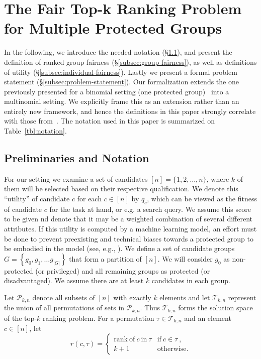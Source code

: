 
\section{The Fair Top-k Ranking Problem for Multiple Protected Groups}\label{sec:problem}

In the following, we introduce the needed notation (\S\ref{subsec:preliminaries}), and present the definition of ranked group fairness (\S\ref{subsec:group-fairness}), as well as definitions of utility (\S\ref{subsec:individual-fairness}). Lastly we present a formal problem statement (\S\ref{subsec:problem-statement}).
%
Our formalization extends the one previously presented for a binomial setting (one protected group)~\cite{zehlike2017fair} into a multinomial setting. 
%
We explicitly frame this as an extension rather than an entirely new framework, and hence the definitions in this paper strongly correlate with those from~\cite{zehlike2017fair}.
%
The notation used in this paper is summarized on Table~\ref{tbl:notation}.

\subsection{Preliminaries and Notation}
\label{subsec:preliminaries}
For our setting we examine a set of candidates $[n] = \{ 1, 2, \dots, n \}$, where $k$ of them will be selected based on their respective qualification. We denote this ``utility'' of candidate $c$ for each $c \in [n]$ by $q_c$, which can be viewed as the fitness of candidate $c$ for the task at hand, or e.g. a search query. We assume this score to be given nd denote that it may be a weighted combination of several different attributes.
%
If this utility is computed by a machine learning model, an effort must be done to prevent preexisting and technical biases towards a protected group to be embodied in the model (see, e.g., \cite{Sweeney2013}).
%
We define a set of candidate groups $G = \left\{g_0, g_1, \ldots g_{|G|}\right\}$ that form a partition of $[n]$. We will consider $g_0$ as non-protected (or privileged) and all remaining groups as protected (or disadvantaged).
%
We assume there are at least $k$ candidates in each group. %

Let ${\mathcal P}_{k,n}$ denote all subsets of $[n]$ with exactly $k$ elements and let ${\mathcal T}_{k,n}$ represent the union of all permutations of sets in ${\mathcal P}_{k,n}$.
%
Thus ${\mathcal T}_{k,n}$ forms the solution space of the top-$k$ ranking problem.
%
For a permutation $\tau \in {\mathcal T}_{k,n}$ and an element $c \in [n]$, let
\[
r(c, \tau) = \begin{cases}
\mathrm{rank~of~} c \mathrm{~in~} \tau & \mathrm{if~} c \in \tau~, \\
k + 1 & \mathrm{otherwise}.
\end{cases}
\]

